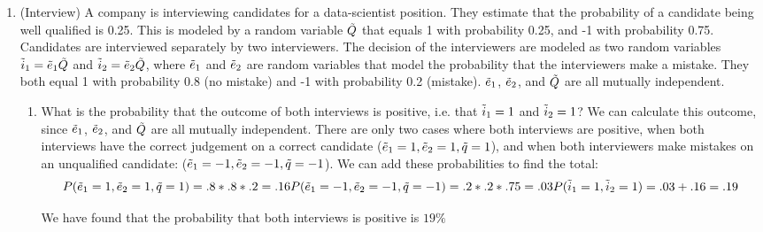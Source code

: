 \documentclass[12pt,twoside]{article}
\begin{document}
\begin{enumerate}
\break

\item (Interview)
A company is interviewing candidates for a data-scientist position. They estimate that the probability of a candidate being well qualified is 0.25. This is modeled by a random variable $\Tilde{Q}$ that equals 1 with probability 0.25, and -1 with probability 0.75. Candidates are interviewed separately by two interviewers. The decision of the interviewers are modeled as two random variables $\Tilde{i}_1 = \Tilde{e}_1\Tilde{Q}$ and $\Tilde{i}_2 = \Tilde{e}_2\Tilde{Q}$, where $\Tilde{e}_1$ and $\Tilde{e}_2$ are random variables that model the probability that the interviewers make a mistake. They both equal 1 with probability 0.8 (no mistake) and -1 with probability 0.2 (mistake). $\Tilde{e}_1$, $\Tilde{e}_2$, and $\Tilde{Q}$ are all mutually independent.      
\begin{enumerate}
\item What is the probability that the outcome of both interviews is positive, i.e. that $\Tilde{i}_1=1$ and $\Tilde{i}_2=1$? 
\subitem
We can calculate this outcome, since $\Tilde{e}_1$, $\Tilde{e}_2$, and $\Tilde{Q}$ are all mutually independent. There are only two cases where both interviews are positive, when both interviews have the correct judgement on a correct candidate ($\Tilde{e}_1=1, \Tilde{e}_2=1, \Tilde{q}=1$), and when both interviewers make mistakes on an unqualified candidate: ($\Tilde{e}_1=-1, \Tilde{e}_2=-1, \Tilde{q}=-1$). We can add these probabilities to find the total:
\begin{equation}
    \begin{split}
       P(\Tilde{e}_1=1, \Tilde{e}_2=1, \Tilde{q}=1) = .8*.8*.2 = .16 
    \end{split}\\
   \begin{split}
       P(\Tilde{e}_1=-1, \Tilde{e}_2=-1, \Tilde{q}=-1) = .2*.2*.75 = .03 
   \end{split}\\
    \begin{split}
        P(\Tilde{i}_1=1, \Tilde{i}_2=1) = .03+.16 = .19 
    \end{split}
\end{equation}

We have found that the probability that both interviews is positive is $19\%$



\end{enumerate}
\end{enumerate}
\end{document}
